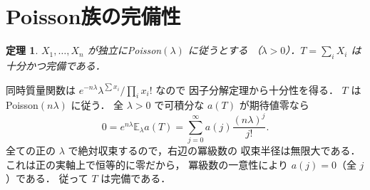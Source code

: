 \documentclass[a5paper,10pt,onecolumn]{jsarticle}
\makeatletter
\theoremstyle{mathnotetheorem}
\newtheorem{theorem}{定理}[section]
\renewcommand{\proofname}{証明}
\renewenvironment{proof}[1][\proofname]{%
  \par\pushQED{\qed}\normalfont\topsep4\p@\@plus2\p@\relax
  \trivlist\item[\hskip\labelsep\bfseries #1]\ignorespaces
}{\popQED\endtrivlist\@endpefalse}
\makeatother
\begin{document}
\section{Poisson族の完備性}
\begin{theorem}
$X_1,\ldots,X_n$ が独立にPoisson$(\lambda)$ に従うとする
（$\lambda>0$）．$T=\sum_iX_i$ は十分かつ完備である．
\end{theorem}
\begin{proof}
同時質量関数は
$e^{-n\lambda}\lambda^{\sum x_i}/\prod_i x_i!$ なので
因子分解定理から十分性を得る．
$T$ はPoisson$(n\lambda)$ に従う．
全 $\lambda>0$ で可積分な $a(T)$ が期待値零なら
\[
 0=e^{n\lambda}\mathbb E_\lambda a(T)
 =\sum_{j=0}^\infty a(j)\frac{(n\lambda)^j}{j!}.
\]
全ての正の $\lambda$ で絶対収束するので，右辺の冪級数の
収束半径は無限大である．これは正の実軸上で恒等的に零だから，
冪級数の一意性により $a(j)=0$（全 $j$）である．
従って $T$ は完備である．
\end{proof}
\end{document}
